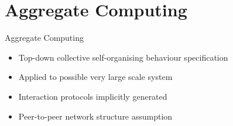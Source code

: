 \section{Aggregate Computing}
\begin{frame}{Aggregate Computing~\cite{DBLP:journals/jlap/ViroliBDACP19}}
  \begin{cardTiny}
    \begin{itemize}
      \item Top-down collective self-organising behaviour specification
      \item Applied to possible very large scale system
      \item Interaction protocols implicitly generated
      \item[\failure{\faThumbsDown}] Peer-to-peer network structure assumption
    \end{itemize}
  \end{cardTiny}
  \centering
  \begin{multicols}{2}
    \raggedleft
  \end{multicols}
\end{frame}